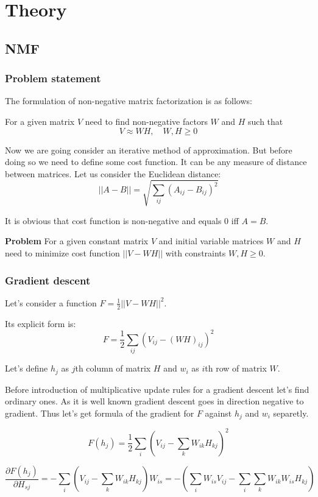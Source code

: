 \documentclass{extreport}
\begin{document}
\section{Theory}

\subsection{NMF}

\subsubsection{Problem statement}

The formulation of non-negative matrix factorization is as follows:

For a given matrix $V$ need to find non-negative factors $W$ and $H$
such that
\[
  V \approx WH, \quad W,H \geqslant 0
\]

Now we are going consider an iterative method of approximation.
But before doing so we need to define some cost function.
It can be any measure of distance between matrices.
Let us consider the Euclidean distance:
\[
  ||A - B|| = \sqrt{\sum_{ij} (A_{ij} - B_{ij})^2}
\]

It is obvious that cost function is non-negative
and equals 0 iff $A = B$.

\textbf{Problem} For a given constant matrix $V$
and initial variable matrices $W$ and $H$
need to minimize cost function $||V - WH||$ with constraints
$W,H \geqslant 0$.

\subsubsection{Gradient descent}
Let's consider a function $F = \frac{1}{2}||V - WH||^2$.

Its explicit form is:
\[
  F = \frac{1}{2} \sum_{ij}
  \left(
    V_{ij} - (WH)_{ij}
  \right)^2
\]

Let's define $h_j$ as $j$th column of matrix $H$
and $w_i$ as $i$th row of matrix $W$.

Before introduction of multiplicative update rules
for a gradient descent let's find ordinary ones.
As it is well known gradient descent goes in direction
negative to gradient. Thus let's get formula of the gradient
for $F$ against $h_j$ and $w_i$ separetly.

\[
  F(h_j) = \frac{1}{2} \sum_{i}
  \left(
    V_{ij} - \sum_{k}W_{ik}H_{kj}
  \right)^2
\]

\[
  \frac{\partial F(h_j)}{\partial H_{sj}} =
  - \sum_i
    \left(
      V_{ij} - \sum_k W_{ik}H_{kj}
    \right)
  W_{is} =
  -
    \left(
      \sum_i W_{is}V_{ij} - \sum_i\sum_kW_{ik}W_{is}H_{kj}
    \right)
\]
\end{document}
